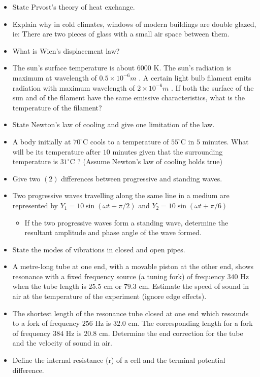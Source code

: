 \documentclass{article}
\begin{document}
\begin{itemize}
\item State Prvost's theory of heat exchange.
\item Explain why in cold climates, windows of modern buildings are double glazed, ie: There are two pieces of glass with a small air space between them.
\item What is Wien's displacement law?
\item The sun's surface temperature is about $ 6000$ K.  The sun's radiation is maximum at wavelength of $ 0.5\times10^{-6}m$ .  A certain light bulb filament emits radiation with maximum wavelength of $ 2\times10^{-6}m$ .  If both the surface of the sun and of the filament have the same emissive characteristics, what is the temperature of the filament?
\item State Newton’s law of cooling and give one limitation of the law.
\item A body initially at $ 70^{\circ}$C cools to a temperature of $ 55^{\circ}$C in $ 5$ minutes. What will be its temperature after $ 10$ minutes given that the surrounding temperature is $ 31^{\circ}$C ? (Assume Newton’s law of cooling holds true)
\item Give two $ (2)$ differences between progressive and standing waves.
\item Two progressive waves travelling along the same line in a medium are represented by $ Y_{1}=10 \sin(\omega t +\pi/2)$ and $ Y_{2}=10 \sin(\omega t +\pi/6)$
 \begin{itemize}
\item If the two progressive waves form a standing wave, determine the resultant amplitude and phase angle of the wave formed.
\end{itemize}
\item State the modes of vibrations in closed and open pipes.  
\item A metre-long tube at one end, with a movable piston at the other end, shows resonance with a fixed frequency source (a tuning fork) of frequency $ 340$ Hz when the tube length is $ 25.5$ cm or $ 79.3$ cm.  Estimate the speed of sound in air at the temperature of the experiment (ignore edge effects).
\item The shortest length of the resonance tube closed at one end which resounds to a fork of frequency $ 256$ Hz is $ 32.0$ cm.  The corresponding length for a fork of frequency $ 384$ Hz is $ 20.8$ cm.  Determine the end correction for the tube and the velocity of sound in air.
\item Define the internal resistance (r) of a cell and the terminal potential difference.

\end{itemize}
\end{document}
